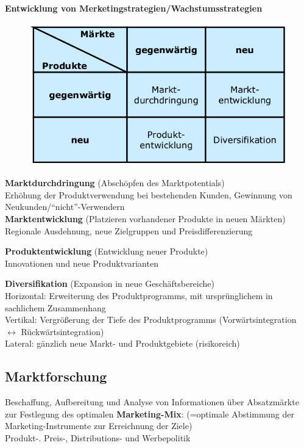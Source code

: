 \documentclass[a4paper,11pt, twoside]{article}
\newcommand\mpar[1]{\marginpar {\flushleft\small #1}}
\begin{document}
\textbf{Entwicklung von Merketingstrategien/Wachstumsstrategien} 

\begin{figure}[h]
 \begin{center}
   \includegraphics[scale=0.3]{bilder/marketingstrategien.png}
 \end{center}
\end{figure}

\textbf{Marktdurchdringung} (Abschöpfen des Marktpotentials)\\
Erhöhung der Produktverwendung bei bestehenden Kunden, Gewinnung von Neukunden/"`nicht"'-Verwendern\\

\textbf{Marktentwicklung} (Platzieren vorhandener Produkte in neuen Märkten)\\
Regionale Ausdehnung, neue Zielgruppen und Preisdifferenzierung

\textbf{Produktentwicklung} (Entwicklung neuer Produkte)\\
Innovationen und neue Produktvarianten

\mpar{\textcolor{red}{risikoreichste Wachstumstrategie}}

\textbf{Diversifikation} (Expansion in neue Geschäftsbereiche)\\
Horizontal: Erweiterung des Produktprogramms, mit ursprünglichem in sachlichem Zusammenhang\\
Vertikal: Vergrößerung der Tiefe des Produktprogramms (Vorwärtsintegration $\leftrightarrow$ Rückwärtsintegration)\\
Lateral: gänzlich neue Markt- und Produktgebiete (risikoreich)\\

\subsection{Marktforschung}
Beschaffung, Aufbereitung und Analyse von Informationen über Absatzmärkte zur Festlegung des optimalen \textbf{Marketing-Mix}: (=optimale Abstimmung der Marketing-Instrumente zur Erreichnung der Ziele)\\
Produkt-. Preis-, Distributions- und Werbepolitik
\end{document}
